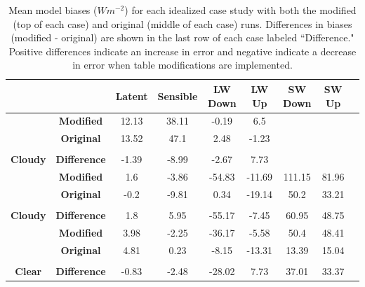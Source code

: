 \begin{table}[b!]
\centering
\footnotesize
\doublespacing
{
\begin{tabular}{| c | c | c | c | c | c | c | c | c |}
\hline
\rowcolor[HTML]{F3F3F3} & & \textbf{Latent} & \textbf{Sensible} & \textbf{LW Down} & \textbf{LW Up} & \textbf{SW Down} & \textbf{SW Up} \\
\hline 
\cellcolor[HTML]{F3F3F3} & \cellcolor[HTML]{F3F3F3} \textbf{Modified} & 12.13 & 	38.11	& -0.19	& 6.5 & & \\
\cellcolor[HTML]{F3F3F3}& \cellcolor[HTML]{F3F3F3} \textbf{Original} & 13.52 &	47.1	& 2.48	& -1.23 & & \\
\cellcolor[HTML]{F3F3F3}\multirow{-3}{*}{\shortstack{\textbf{Winter} \\ \textbf{Cloudy}}} & \cellcolor[HTML]{F3F3F3} \textbf{Difference} & -1.39 &	-8.99 &	-2.67 &	7.73 & & \\
\hline
\cellcolor[HTML]{F3F3F3} & \cellcolor[HTML]{F3F3F3} \textbf{Modified} & 1.6 &	-3.86 &	-54.83	& -11.69 &	111.15 &	81.96 \\
\cellcolor[HTML]{F3F3F3} & \cellcolor[HTML]{F3F3F3} \textbf{Original} & -0.2 &	-9.81 &	0.34 &	-19.14 &	50.2 &	33.21 \\
\cellcolor[HTML]{F3F3F3} \multirow{-3}{*}{\shortstack{\textbf{Spring} \\ \textbf{Cloudy}}} & \cellcolor[HTML]{F3F3F3} \textbf{Difference} & 1.8 &	5.95 &	-55.17	& -7.45	& 60.95 &	48.75 \\
\hline
\cellcolor[HTML]{F3F3F3} & \cellcolor[HTML]{F3F3F3} \textbf{Modified} & 3.98	& -2.25 &	-36.17 &	-5.58 &	50.4 &	48.41 \\
\cellcolor[HTML]{F3F3F3} & \cellcolor[HTML]{F3F3F3} \textbf{Original} & 4.81	& 0.23	& -8.15 & 	-13.31	& 13.39	& 15.04 \\
\cellcolor[HTML]{F3F3F3} \multirow{-3}{*}{\shortstack{\textbf{Spring} \\ \textbf{Clear}}} & \cellcolor[HTML]{F3F3F3} \textbf{Difference} \cellcolor[HTML]{F3F3F3} & -0.83 &	-2.48	& -28.02	& 7.73 &	37.01	& 33.37 \\
\hline
\end{tabular}}
\caption[Mean model bias for idealized WRF runs with modified LANDUSE.TBL values.]{Mean model biases ($Wm^{-2}$) for each idealized case study with both the modified (top of each case) and original (middle of each case) runs. Differences in biases (modified - original) are shown in the last row of each case labeled ``Difference." Positive differences indicate an increase in error and negative indicate a decrease in error when table modifications are implemented.}
\label{tab:wrf:meanbias}
\end{table}

